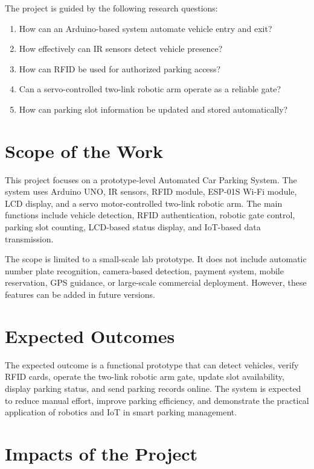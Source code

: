 The project is guided by the following research questions:

\begin{enumerate}
    \item How can an Arduino-based system automate vehicle entry and exit?
    \item How effectively can IR sensors detect vehicle presence?
    \item How can RFID be used for authorized parking access?
    \item Can a servo-controlled two-link robotic arm operate as a reliable gate?
    \item How can parking slot information be updated and stored automatically?
\end{enumerate}

\section{Scope of the Work}

This project focuses on a prototype-level Automated Car Parking System. The system uses Arduino UNO, IR sensors, RFID module, ESP-01S Wi-Fi module, LCD display, and a servo motor-controlled two-link robotic arm. The main functions include vehicle detection, RFID authentication, robotic gate control, parking slot counting, LCD-based status display, and IoT-based data transmission.

The scope is limited to a small-scale lab prototype. It does not include automatic number plate recognition, camera-based detection, payment system, mobile reservation, GPS guidance, or large-scale commercial deployment. However, these features can be added in future versions.

\section{Expected Outcomes}

The expected outcome is a functional prototype that can detect vehicles, verify RFID cards, operate the two-link robotic arm gate, update slot availability, display parking status, and send parking records online. The system is expected to reduce manual effort, improve parking efficiency, and demonstrate the practical application of robotics and IoT in smart parking management.

\section{Impacts of the Project}

